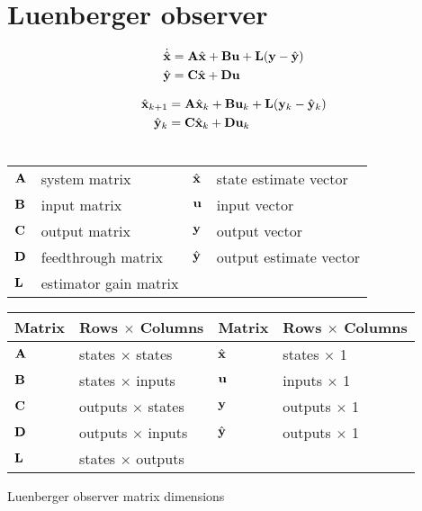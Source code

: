\section{Luenberger observer}

\begin{theorem}
  \begin{align}
    \dot{\hat{\mathbf{x}}} &= \mathbf{A}\hat{\mathbf{x}} + \mathbf{B}\mathbf{u} +
      \mathbf{L} (\mathbf{y} - \hat{\mathbf{y}}) \\
    \hat{\mathbf{y}} &= \mathbf{C}\hat{\mathbf{x}} + \mathbf{D}\mathbf{u}
  \end{align}

  \begin{align}
    \hat{\mathbf{x}}_{k+1} &= \mathbf{A}\hat{\mathbf{x}}_k + \mathbf{B}\mathbf{u}_k +
      \mathbf{L}(\mathbf{y}_k - \hat{\mathbf{y}}_k) \label{eq:z_obsv_x} \\
    \hat{\mathbf{y}}_k &= \mathbf{C}\hat{\mathbf{x}}_k + \mathbf{D}\mathbf{u}_k
      \label{eq:z_obsv_y} \\ \nonumber
  \end{align}

  \begin{figurekey}
    \begin{tabular}{llll}
      $\mathbf{A}$ & system matrix      & $\hat{\mathbf{x}}$ & state estimate vector \\
      $\mathbf{B}$ & input matrix       & $\mathbf{u}$ & input vector \\
      $\mathbf{C}$ & output matrix      & $\mathbf{y}$ & output vector \\
      $\mathbf{D}$ & feedthrough matrix & $\hat{\mathbf{y}}$ & output estimate vector \\
      $\mathbf{L}$ & estimator gain matrix & & \\
    \end{tabular}
  \end{figurekey}
\end{theorem}

\begin{booktable}
  \begin{tabular}{|ll|ll|}
    \hline
    \rowcolor{headingbg}
    \textbf{Matrix} & \textbf{Rows $\times$ Columns} &
    \textbf{Matrix} & \textbf{Rows $\times$ Columns} \\
    \hline
    $\mathbf{A}$ & states $\times$ states & $\hat{\mathbf{x}}$ & states $\times$ 1 \\
    $\mathbf{B}$ & states $\times$ inputs & $\mathbf{u}$ & inputs $\times$ 1 \\
    $\mathbf{C}$ & outputs $\times$ states & $\mathbf{y}$ & outputs $\times$ 1 \\
    $\mathbf{D}$ & outputs $\times$ inputs & $\hat{\mathbf{y}}$ & outputs $\times$ 1 \\
    $\mathbf{L}$ & states $\times$ outputs & & \\
    \hline
  \end{tabular}
  \caption{Luenberger observer matrix dimensions}
\end{booktable}

